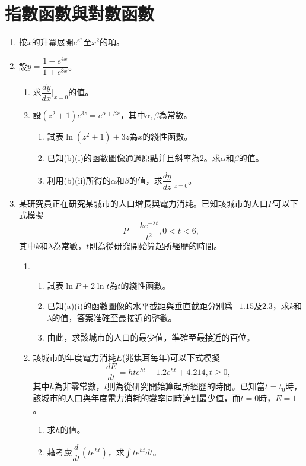 \documentclass[12pt]{article}
\begin{document}
    \section{指數函數與對數函數}
    \begin{enumerate}
        \item 按$x$的升冪展開$e^{e^x}$至$x^2$的項。
        \item 設$y=\dfrac{1-e^{4x}}{1+e^{8x}}$。\begin{enumerate}
            \item 求$\dfrac{dy}{dx}\bigg|_{x=0}$的值。
            \item 設$(z^2+1)e^{3z}=e^{\alpha+\beta x}$，其中$\alpha,\beta$為常數。\begin{enumerate}
                \item 試表$\ln(z^2+1)+3z$為$x$的綫性函數。
                \item 已知(b)(i)的函數圖像通過原點并且斜率為2。求$\alpha$和$\beta$的值。
                \item 利用(b)(ii)所得的$\alpha$和$\beta$的值，求$\dfrac{dy}{dz}\bigg|_{z=0}$。
            \end{enumerate}
        \end{enumerate}
        \item 某研究員正在研究某城市的人口增長與電力消耗。已知該城市的人口$P$可以下式模擬\[P=\frac{ke^{-\lambda t}}{t^2}, 0<t<6,\]其中$k$和$\lambda$為常數，$t$則為從研究開始算起所經歷的時間。\begin{enumerate}
            \item \begin{enumerate}
                \item 試表$\ln{P}+2\ln{t}$為$t$的綫性函數。
                \item 已知(a)(i)的函數圖像的水平截距與垂直截距分別爲$-1.15$及$2.3$，求$k$和$\lambda$的值，答案准確至最接近的整數。
                \item 由此，求該城市的人口的最少值，準確至最接近的百位。
            \end{enumerate}
            \item 該城市的年度電力消耗$E$(兆焦耳每年)可以下式模擬\[\frac{dE}{dt}=hte^{ht}-1.2e^{ht}+4.214, t\geq 0,\]其中$h$為非零常數，$t$則為從研究開始算起所經歷的時間。已知當$t=t_0$時，該城市的人口與年度電力消耗的變率同時達到最少值，而$t=0$時，$E=1$。\begin{enumerate}
                \item 求$h$的值。
                \item 藉考慮$\dfrac{d}{dt}(te^{ht})$，求$\int te^{ht} dt$。

\end{enumerate}
\end{enumerate}
\end{enumerate}
\end{document}
